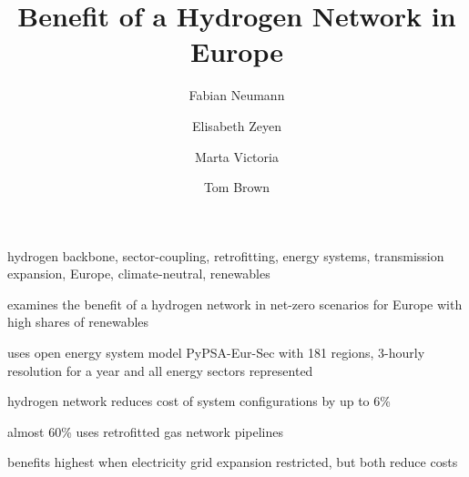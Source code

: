 \documentclass[12pt,1p]{elsarticle}
\begin{document}
\begin{frontmatter}

	\title{Benefit of a Hydrogen Network in Europe}

	\author[tubaddress]{Fabian Neumann}
	\author[tubaddress]{Elisabeth Zeyen}
	\author[aarhus,aarhus2]{Marta Victoria}
	\author[tubaddress]{Tom Brown}
	\address[tubaddress]{Department of Digital Transformation in Energy Systems, Institute of Energy Technology, Technische Universität Berlin, Fakultät III, Einsteinufer 25 (TA 8), 10587 Berlin, Germany}
	\address[aarhus]{Department of Mechanical and Production Engineering, Aarhus University, Inge Lehmanns Gade 10, 8000 Aarhus, Denmark}
	\address[aarhus2]{iCLIMATE Interdisciplinary Centre for Climate Change, Aarhus University}

	\begin{abstract}
		
	\end{abstract}

	\begin{keyword}
		hydrogen backbone, sector-coupling, retrofitting, energy systems, transmission expansion, Europe, climate-neutral, renewables
	\end{keyword}

	\begin{graphicalabstract}
	\end{graphicalabstract}

	\begin{highlights}
		\item examines the benefit of a hydrogen network in net-zero scenarios for Europe with high shares of renewables
		\item uses open energy system model PyPSA-Eur-Sec with 181 regions, 3-hourly resolution for a year and all energy sectors represented
		\item hydrogen network reduces cost of system configurations by up to 6\%
		\item almost 60\% uses retrofitted gas network pipelines
		\item benefits highest when electricity grid expansion restricted, but both reduce costs
	\end{highlights}

\end{frontmatter}

\listoftodos[TODOs]

\begin{small}
	\tableofcontents
\end{small}
~\\
\end{document}
